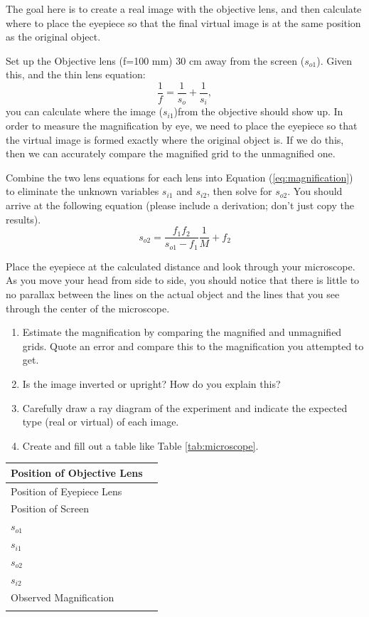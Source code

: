 The goal here is to create a real image with the objective lens, and then calculate where to place the eyepiece so that the final virtual image is at the same position as the original object.

Set up the Objective lens (f=100 mm) 30 cm away from the screen ($s_{o1}$). Given this, and the thin lens equation:
$$
\frac{1}{f}=\frac{1}{s_{o}}+\frac{1}{s_i},
$$
you can calculate where the image ($s_{i1}$)from the objective should show up. In order to measure the magnification by eye, we need to place the eyepiece so that the virtual image is formed exactly where the original object is. If we do this, then we can accurately compare the magnified grid to the unmagnified one.\myskip

Combine the two lens equations for each lens into Equation (\ref{eq:magnification}) to eliminate the unknown variables $s_{i1}$ and $s_{i2}$, then solve for $s_{o2}$. You should arrive at the following equation (please include a derivation; don't just copy the results).
\begin{equation}
  s_{o2} = \frac{f_1 f_2}{s_{o1} - f_1} \frac{1}{M} + f_2
\end{equation}

Place the eyepiece at the calculated distance and look through your microscope. As you move your head from side to side, you should notice that there is little to no parallax between the lines on the actual object and the lines that you see through the center of the microscope.

\begin{enumerate}
\item Estimate the magnification by comparing the magnified and unmagnified grids. Quote an error and compare this to the magnification you attempted to get.

\item Is the image inverted or upright? How do you explain this?

\item Carefully draw a ray diagram of the experiment and indicate the expected type (real or virtual) of each image.

\item Create and fill out a table like Table \ref{tab:microscope}.

\end{enumerate}
\begin{center}
\begin{tabular}{|l|l|}
\hline
Position of Objective Lens & \hspace{4 cm} \\ \hline
Position of Eyepiece Lens &                    \\ \hline
Position of Screen &                    \\ \hline
$s_{o1}$ & \\ \hline
$s_{i1}$ & \\ \hline
$s_{o2}$ & \\ \hline
$s_{i2}$ & \\ \hline
Observed Magnification & \\ \hline
\label{tab:microscope}
\end{tabular}
\end{center}

